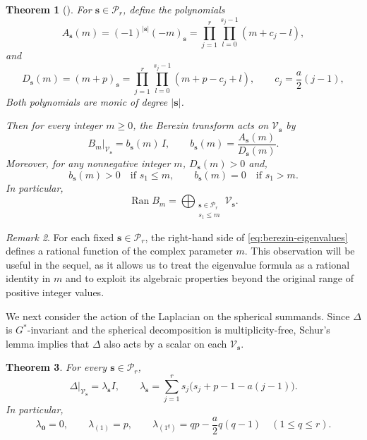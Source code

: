 \documentclass[11pt,reqno]{amsart}
\newtheorem{theorem}{Theorem}[section]
\theoremstyle{corollary}
\theoremstyle{conjecture}
\theoremstyle{assumption}
\theoremstyle{proposition}
\theoremstyle{remark}
\newtheorem{remark}[theorem]{Remark}
\numberwithin{equation}{section}
\begin{document}
\begin{theorem}[{\cite[Theorem~3.6]{Zhang1998}}]
\label{thm:berezin-eigenvalues}
For $\mathbf s\in\mathcal P_r$, define the polynomials
\begin{equation}\label{eq:numerator}
A_{\mathbf s}(m)=(-1)^{|\mathbf s|}(-m)_{\mathbf s}=\prod_{j=1}^r\prod_{l=0}^{s_j-1}(m+c_j-l),
\end{equation}
and
\begin{equation}\label{eq:denominator}
D_{\mathbf s}(m)=(m+p)_{\mathbf s}=\prod_{j=1}^r\prod_{l=0}^{s_j-1}(m+p-c_j+l),\qquad c_j=\frac{a}{2}(j-1),
\end{equation}
Both polynomials are monic of degree $|\mathbf s|$.

Then for every integer $m\ge0$, the Berezin transform acts on $\mathcal V_{\mathbf s}$ by
\begin{equation}\label{eq:berezin-eigenvalues}
B_m|_{\mathcal V_{\mathbf s}}=b_{\mathbf s}(m)\,I,\qquad b_{\mathbf s}(m)=\frac{A_{\mathbf s}(m)}{D_{\mathbf s}(m)}.
\end{equation}
Moreover, for any nonnegative integer $m$, $D_{\mathbf s}(m)>0$ and,
\[
b_{\mathbf s}(m)>0 \quad\text{if }s_1\leq m,\qquad b_{\mathbf s}(m)=0 \quad\text{if }s_1>m.
\]
In particular,
\[
\operatorname{Ran}B_m=\bigoplus_{\substack{\mathbf s\in\mathcal P_r\\s_1\le m}}\mathcal V_{\mathbf s}.
\]
\end{theorem}

\begin{remark}
For each fixed $\mathbf s\in\mathcal P_r$, the right-hand side of \eqref{eq:berezin-eigenvalues} defines a rational function of the complex parameter $m$. This observation will be useful in the sequel, as it allows us to treat the eigenvalue formula as a rational identity in $m$ and to exploit its algebraic properties beyond the original range of positive integer values.
\end{remark}

We next consider the action of the Laplacian on the spherical summands. Since $\Delta$ is $G^*$-invariant and the spherical decomposition is multiplicity-free, Schur's lemma implies that $\Delta$ also acts by a scalar on each $\mathcal V_{\mathbf s}$.

\begin{theorem}\label{thm:laplace-spectrum}
For every $\mathbf s\in\mathcal P_r$,
\[
\Delta|_{\mathcal V_{\mathbf s}}=\lambda_{\mathbf s}I,\qquad\lambda_{\mathbf s}=\sum_{j=1}^r s_j\bigl(s_j+p-1-a(j-1)\bigr).
\]
In particular,
\[
\lambda_{\mathbf0}=0,\qquad\lambda_{(1)}=p,\qquad\lambda_{(1^q)}=qp-\frac a2q(q-1)\quad(1\leq q\leq r).
\]
\end{theorem}
\end{document}

